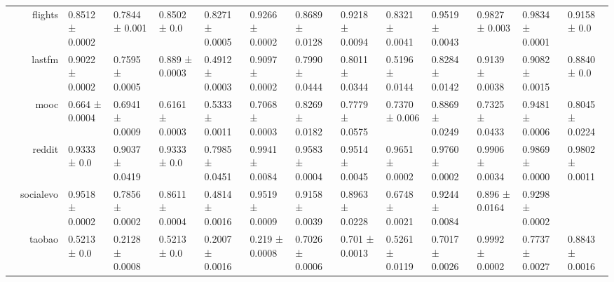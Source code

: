 {\begin{tabular}{@{}crllllllllllll@{}}
                                    & flights              & 0.8512 ± 0.0002           & 0.7844 ± 0.001             & 0.8502 ± 0.0              & 0.8271 ± 0.0005            & \multicolumn{1}{l|}{0.9266 ± 0.0002} & 0.8689 ± 0.0128           & 0.9218 ± 0.0094           & 0.8321 ± 0.0041          & 0.9519 ± 0.0043         & 0.9827 ± 0.003          & 0.9834 ± 0.0001          & 0.9158 ± 0.0               \\
                                    & lastfm               & 0.9022 ± 0.0002           & 0.7595 ± 0.0005            & 0.889 ± 0.0003            & 0.4912 ± 0.0003            & \multicolumn{1}{l|}{0.9097 ± 0.0002} & 0.7990 ± 0.0444           & 0.8011 ± 0.0344           & 0.5196 ± 0.0144          & 0.8284 ± 0.0142         & 0.9139 ± 0.0038         & 0.9082 ± 0.0015          & 0.8840 ± 0.0               \\
                                    & mooc                 & 0.664 ± 0.0004            & 0.6941 ± 0.0009            & 0.6161 ± 0.0003           & 0.5333 ± 0.0011            & \multicolumn{1}{l|}{0.7068 ± 0.0003} & 0.8269 ± 0.0182           & 0.7779 ± 0.0575           & 0.7370 ± 0.006           & 0.8869 ± 0.0249         & 0.7325 ± 0.0433         & 0.9481 ± 0.0006          & 0.8045 ± 0.0224            \\
                                    & reddit               & 0.9333 ± 0.0              & 0.9037 ± 0.0419            & 0.9333 ± 0.0              & 0.7985 ± 0.0451            & \multicolumn{1}{l|}{0.9941 ± 0.0084} & 0.9583 ± 0.0004           & 0.9514 ± 0.0045           & 0.9651 ± 0.0002          & 0.9760 ± 0.0002         & 0.9906 ± 0.0034         & 0.9869 ± 0.0000          & 0.9802 ± 0.0011            \\
                                    & socialevo            & 0.9518 ± 0.0002           & 0.7856 ± 0.0002            & 0.8611 ± 0.0004           & 0.4814 ± 0.0016            & \multicolumn{1}{l|}{0.9519 ± 0.0009} & 0.9158 ± 0.0039           & 0.8963 ± 0.0228           & 0.6748 ± 0.0021          & 0.9244 ± 0.0084         & 0.896 ± 0.0164          & 0.9298 ± 0.0002          &                            \\
                                    & taobao               & 0.5213 ± 0.0              & 0.2128 ± 0.0008            & 0.5213 ± 0.0              & 0.2007 ± 0.0016            & \multicolumn{1}{l|}{0.219 ± 0.0008}  & 0.7026 ± 0.0006           & 0.701 ± 0.0013            & 0.5261 ± 0.0119          & 0.7017 ± 0.0026         & 0.9992 ± 0.0002         & 0.7737 ± 0.0027          & 0.8843 ± 0.0016            \\

\end{tabular}}
